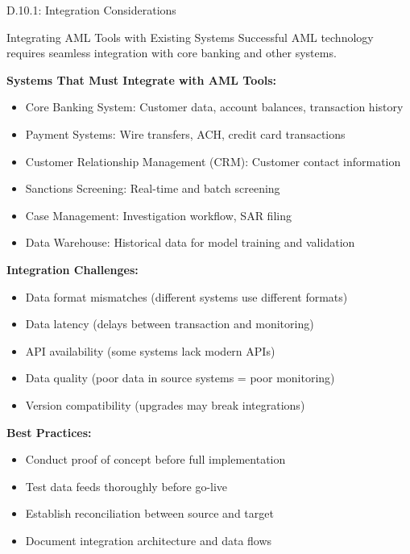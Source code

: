 \documentclass[11pt,a4paper]{beamer}
\begin{document}
\begin{frame}{D.10.1: Integration Considerations}
	\begin{block}{Integrating AML Tools with Existing Systems}
		Successful AML technology requires seamless integration with core banking and other systems.
	\end{block}
	\textbf{Systems That Must Integrate with AML Tools:}
	\begin{itemize}
		\item Core Banking System: Customer data, account balances, transaction history
		\item Payment Systems: Wire transfers, ACH, credit card transactions
		\item Customer Relationship Management (CRM): Customer contact information
		\item Sanctions Screening: Real-time and batch screening
		\item Case Management: Investigation workflow, SAR filing
		\item Data Warehouse: Historical data for model training and validation
	\end{itemize}
	\textbf{Integration Challenges:}
	\begin{itemize}
		\item Data format mismatches (different systems use different formats)
		\item Data latency (delays between transaction and monitoring)
		\item API availability (some systems lack modern APIs)
		\item Data quality (poor data in source systems = poor monitoring)
		\item Version compatibility (upgrades may break integrations)
	\end{itemize}
	\textbf{Best Practices:}
	\begin{itemize}
		\item Conduct proof of concept before full implementation
		\item Test data feeds thoroughly before go-live
		\item Establish reconciliation between source and target
		\item Document integration architecture and data flows
	\end{itemize}
\end{frame}

\end{document}
